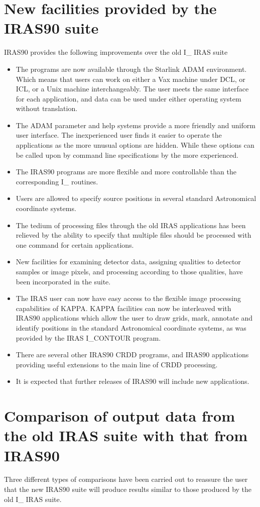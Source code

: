 \section{New facilities provided by the IRAS90 suite}
\label{m:newfac}
IRAS90 provides the following improvements over the old I\_ IRAS suite
\begin{itemize}
\item The programs are now available through the Starlink ADAM environment.
Which 
means that users can work on either a Vax machine under DCL, or ICL, or a Unix 
machine interchangeably. The user meets the same interface for each application,
and data can be used under either operating system without translation.
\item The ADAM parameter and help systems provide a more friendly and uniform
user interface. The inexperienced user finds it easier to operate the 
applications as the more unusual options are hidden. While these options can
be called upon by command line specifications by the more experienced.
\item The IRAS90 programs are more flexible and more controllable than the 
corresponding I\_ routines. 
\item Users are allowed to specify source positions in several standard
Astronomical coordinate systems.
\item The tedium of processing files through the old IRAS applications has
been relieved by the ability to specify that multiple files should be processed
with one command for certain applications.
\item New facilities for examining detector data, assigning qualities to 
detector samples or image pixels, and processing according to those qualities,
have been incorporated in the suite. 
\item The IRAS user can now have easy access to the flexible image processing
capabilities of KAPPA. KAPPA facilities can now be interleaved with IRAS90
applications which allow the user to draw grids, mark, annotate and
identify positions in the standard Astronomical coordinate systems, as was
provided by the IRAS I\_CONTOUR program.
\item There are several other IRAS90 CRDD programs, and IRAS90 applications
providing useful extensions to the main line of CRDD processing.
\item It is expected that further releases of IRAS90 will include new
applications.
\end{itemize}
\section{Comparison of output data from the old IRAS suite with that from 
IRAS90}
\label{m:oldnew}
Three different types of comparisons have been carried out to reassure the user
that the new IRAS90 suite will produce results similar to those produced by
the old  I\_ IRAS suite. 

